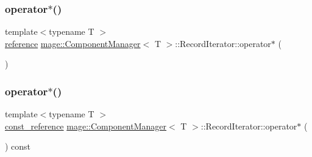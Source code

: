 \subsubsection{\texorpdfstring{operator$\ast$()}{operator*()}\hspace{0.1cm}{\footnotesize\ttfamily [1/2]}}
{\footnotesize\ttfamily template$<$typename T $>$ \\
\mbox{\hyperlink{classmage_1_1_component_manager_1_1_record_iterator_a79a091c8d61811bc67982e19500ab6eb}{reference}} \mbox{\hyperlink{classmage_1_1_component_manager}{mage\+::\+Component\+Manager}}$<$ T $>$\+::Record\+Iterator\+::operator$\ast$ (\begin{DoxyParamCaption}{ }\end{DoxyParamCaption})\hspace{0.3cm}{\ttfamily [noexcept]}}

\mbox{\label{classmage_1_1_component_manager_1_1_record_iterator_afda4f03298891b6d6ba72f8d99d8c635}} 
\subsubsection{\texorpdfstring{operator$\ast$()}{operator*()}\hspace{0.1cm}{\footnotesize\ttfamily [2/2]}}
{\footnotesize\ttfamily template$<$typename T $>$ \\
\mbox{\hyperlink{classmage_1_1_component_manager_1_1_record_iterator_a811f90589628f6726fdf264b0d3b89a0}{const\+\_\+reference}} \mbox{\hyperlink{classmage_1_1_component_manager}{mage\+::\+Component\+Manager}}$<$ T $>$\+::Record\+Iterator\+::operator$\ast$ (\begin{DoxyParamCaption}{ }\end{DoxyParamCaption}) const\hspace{0.3cm}{\ttfamily [noexcept]}}

\mbox{\label{classmage_1_1_component_manager_1_1_record_iterator_a234d5f94584c7bda7eeb7d0d2a5b1968}} 
